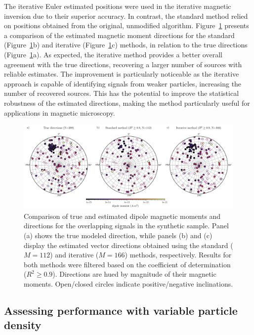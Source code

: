 The iterative Euler estimated positions were used in the iterative magnetic inversion due to their superior accuracy. In contrast, the standard method relied on positions obtained from the original, unmodified algorithm. Figure~\ref{inversion2} presents a comparison of the estimated magnetic moment directions for the standard (Figure~\ref{inversion2}b) and iterative (Figure~\ref{inversion2}c) methods, in relation to the true directions (Figure~\ref{inversion2}a). As expected, the iterative method provides a better overall agreement with the true directions, recovering a larger number of sources with reliable estimates. The improvement is particularly noticeable as the iterative approach is capable of identifying signals from weaker particles, increasing the number of recovered sources. This has the potential to improve the statistical robustness of the estimated directions, making the method particularly useful for applications in magnetic microscopy.


\begin{figure}[tb!]
  \centering
  \includegraphics[width=1\linewidth]{micromag-interfering-sources/figures/synthetic-data-stereograms-comparison.png}
  \caption{
    Comparison of true and estimated dipole magnetic moments and directions for the overlapping signals in the synthetic sample. Panel (a) shows the true modeled direction, while panels (b) and (c) display the estimated vector directions obtained using the standard ($M = 112$) and iterative ($M = 166$) methods, respectively. Results for both methods were filtered based on the coefficient of determination ($R^2 \geq 0.9$). Directions are hued by magnitude of their magnetic moments. Open/closed circles indicate positive/negative inclinations.
  }
  \label{inversion2}
\end{figure}



\subsection{Assessing performance with variable particle density}

